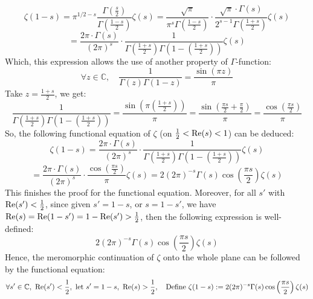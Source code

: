 \documentclass{article}
\begin{document}
$$\zeta(1-s)=\pi ^{1/2-s}\frac{\Gamma\left(\frac{s}{2}\right)}{\Gamma\left(\frac{1-s}{2}\right)}\zeta(s) = \frac{\sqrt{\pi}}{\pi^s\Gamma\left(\frac{1-s}{2}\right)}\cdot\frac{\sqrt{\pi}\cdot \Gamma(s)}{2^{s-1}\Gamma\left(\frac{1+s}{2}\right)}\zeta(s)$$
$$ = \frac{2\pi \cdot\Gamma(s)}{(2\pi)^{s}}\cdot \frac{1}{\Gamma\left(\frac{1+s}{2}\right)\Gamma\left(1-\left(\frac{1+s}{2}\right)\right)}\zeta(s)$$
Which, this expression allows the use of another property of $\Gamma$-function:
$$\forall z\in \mathbb{C},\quad \frac{1}{\Gamma(z)\Gamma(1-z)}=\frac{\sin(\pi z)}{\pi}$$
Take $z=\frac{1+s}{2}$, we get:
$$\frac{1}{\Gamma\left(\frac{1+s}{2}\right)\Gamma\left(1-\left(\frac{1+s}{2}\right)\right)} =\frac{\sin\left(\pi\left(\frac{1+s}{2}\right)\right)}{\pi} = \frac{\sin\left(\frac{\pi s}{2}+\frac{\pi}{2}\right)}{\pi} = \frac{\cos\left(\frac{\pi s}{2}\right)}{\pi}$$
So, the following functional equation of $\zeta$ (on $\frac{1}{2}<\textmd{Re}(s)<1$) can be deduced:
$$\zeta(1-s)=\frac{2\pi \cdot\Gamma(s)}{(2\pi)^{s}}\cdot \frac{1}{\Gamma\left(\frac{1+s}{2}\right)\Gamma\left(1-\left(\frac{1+s}{2}\right)\right)}\zeta(s)$$
$$=\frac{2\pi \cdot\Gamma(s)}{(2\pi)^s}\cdot\frac{\cos\left(\frac{\pi s}{2}\right)}{\pi}\zeta(s) = 2(2\pi)^{-s}\Gamma(s)\cos\left(\frac{\pi s}{2}\right)\zeta(s)$$
This finishes the proof for the functional equation. Moreover, for all $s'$ with $\textmd{Re}(s')<\frac{1}{2}$, since given $s'=1-s$, or $s=1-s'$, we have $\textmd{Re}(s)=\textmd{Re}(1-s')=1-\textmd{Re}(s') > \frac{1}{2}$, then the following expression is well-defined:
$$2(2\pi)^{-s}\Gamma(s)\cos\left(\frac{\pi s}{2}\right)\zeta(s)$$
Hence, the meromorphic continuation of $\zeta$ onto the whole plane can be followed by the functional equation:
$$\forall s'\in\mathbb{C},\ \textmd{Re}(s')<\frac{1}{2},\ \textmd{let }s'=1-s,\ \textmd{Re}(s)>\frac{1}{2},\quad \textmd{Define } \zeta(1-s):=2(2\pi)^{-s}\Gamma(s)\cos\left(\frac{\pi s}{2}\right)\zeta(s)$$
\end{document}
